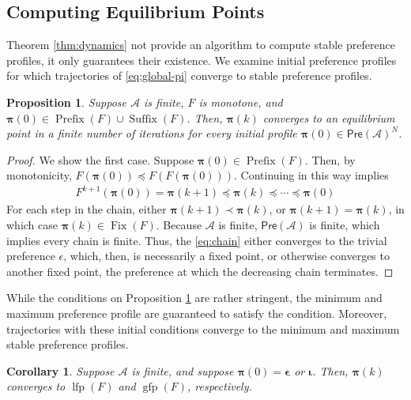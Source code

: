 \documentclass[conference]{ieeeconf}
\newcommand{\A}{\mathcal{A}}
\newcommand{\Pref}{\mathsf{Pre}}
\newcommand{\profile}{\boldsymbol{\pi}}
\DeclareMathOperator{\Fix}{Fix}
\DeclareMathOperator{\Pre}{Prefix}
\DeclareMathOperator{\Post}{Suffix}
\DeclareMathOperator{\lfp}{lfp}
\DeclareMathOperator{\gfp}{gfp}
\newtheorem{corollary}{Corollary}
\newtheorem{proposition}{Proposition}
\begin{document}
\subsection{Computing Equilibrium Points}

Theorem \ref{thm:dynamics} not provide an algorithm to compute stable preference profiles, it only guarantees their existence. We examine initial preference profiles for which trajectories of \eqref{eq:global-pi} converge to stable preference profiles.

\begin{proposition} \label{prop:initial-conditions}
    Suppose $\A$ is finite, $F$ is monotone, and $\profile(0) \in \Pre(F) \cup \Post(F)$. Then, $\profile(k)$ converges to an equilibrium point in a finite number of iterations for every initial profile $\profile(0) \in \Pref(\A)^N$.
\end{proposition}
\begin{proof}
    We show the first case. Suppose $\profile(0) \in \Pre(F)$. Then, by monotonicity, $F(\profile(0)) \preceq F\left( F(\profile(0))\right)$. Continuing in this way implies
    \begin{align}
        F^{k+1}\left( \profile(0)\right)  = \profile(k+1) \preceq \profile(k) \preceq \cdots \preceq \profile(0) \label{eq:chain}
    \end{align} For each step in the chain, either $\profile(k+1) \prec \profile(k)$, or $\profile(k+1) = \profile(k)$, in which case $\profile(k) \in \Fix(F)$. Because $\A$ is finite, $\Pref(\A)$ is finite, which implies every chain is finite. Thus, the \eqref{eq:chain} either converges to the trivial preference $\epsilon$, which, then, is necessarily a fixed point, or otherwise converges to another fixed point, the preference at which the decreasing chain terminates.
\end{proof}

While the conditions on Proposition \ref{prop:initial-conditions} are rather stringent, the minimum and maximum preference profile are guaranteed to satisfy the condition. Moreover, trajectories with these initial conditions converge to the minimum and maximum stable preference profiles.

\begin{corollary}
    Suppose $\A$ is finite, and suppose $\profile(0) = \boldsymbol{\epsilon}$ or $\boldsymbol{\iota}$. Then, $\profile(k)$ converges to $\lfp(F)$ and $\gfp(F)$, respectively.
\end{corollary}
\end{document}
